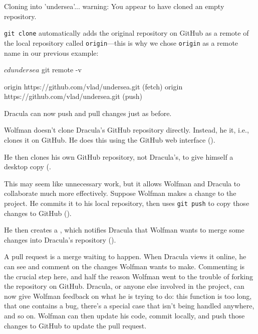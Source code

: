\begin{VerbOut}
Cloning into 'undersea'...
warning: You appear to have cloned an empty repository.
\end{VerbOut}

\texttt{git clone} automatically adds the original repository on GitHub
as a remote of the local repository called \texttt{origin}---this is why
we chose \texttt{origin} as a remote name in our previous example:

\begin{VerbIn}
$ cd undersea
$ git remote -v
\end{VerbIn}

\begin{VerbOut}
origin https://github.com/vlad/undersea.git (fetch)
origin https://github.com/vlad/undersea.git (push)
\end{VerbOut}

Dracula can now push and pull changes just as before.

Wolfman doesn't clone Dracula's GitHub repository directly. Instead, he
 it, i.e., clones it on GitHub. He
does this using the GitHub web interface ().


He then clones his own GitHub repository, not Dracula's, to give himself
a desktop copy (.

This may seem like unnecessary work, but it allows Wolfman and Dracula
to collaborate much more effectively. Suppose Wolfman makes a change to
the project. He commits it to his local repository, then uses
\texttt{git push} to copy those changes to GitHub ().



He then creates a , which
notifies Dracula that Wolfman wants to merge some changes into Dracula's
repository ().


A pull request is a merge waiting to happen. When Dracula views it
online, he can see and comment on the changes Wolfman wants to make.
Commenting is the crucial step here, and half the reason Wolfman went to
the trouble of forking the repository on GitHub. Dracula, or anyone else
involved in the project, can now give Wolfman feedback on what he is
trying to do: this function is too long, that one contains a bug,
there's a special case that isn't being handled anywhere, and so on.
Wolfman can then update his code, commit locally, and push those changes
to GitHub to update the pull request.

